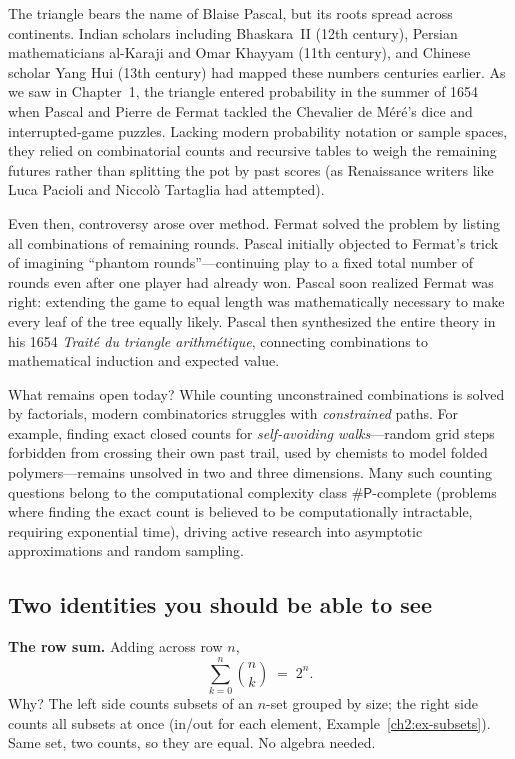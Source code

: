 \begin{historybox}
The triangle bears the name of Blaise Pascal, but its roots spread across continents.
Indian scholars including Bhaskara~II (12th century), Persian mathematicians al-Karaji
and Omar Khayyam (11th century), and Chinese scholar Yang Hui (13th century) had mapped
these numbers centuries earlier. As we saw in Chapter~1, the triangle entered probability
in the summer of 1654 when Pascal and Pierre de Fermat tackled the Chevalier de M\'er\'e's
dice and interrupted-game puzzles. Lacking modern probability notation or sample spaces,
they relied on combinatorial counts and recursive tables to weigh the remaining futures
rather than splitting the pot by past scores (as Renaissance writers like Luca Pacioli and
Niccol\`o Tartaglia had attempted).

Even then, controversy arose over method. Fermat solved the problem by listing all
combinations of remaining rounds. Pascal initially objected to Fermat's trick of
imagining ``phantom rounds''---continuing play to a fixed total number of rounds even
after one player had already won. Pascal soon realized Fermat was right: extending the game
to equal length was mathematically necessary to make every leaf of the tree equally likely.
Pascal then synthesized the entire theory in his 1654 \emph{Trait\'e du triangle
arithm\'etique}, connecting combinations to mathematical induction and expected value.

What remains open today? While counting unconstrained combinations is solved by
factorials, modern combinatorics struggles with \emph{constrained} paths. For example,
finding exact closed counts for \emph{self-avoiding walks}---random grid steps forbidden
from crossing their own past trail, used by chemists to model folded polymers---remains
unsolved in two and three dimensions. Many such counting questions belong to the
computational complexity class $\#\mathsf{P}$-complete (problems where finding the exact
count is believed to be computationally intractable, requiring exponential time), driving
active research into asymptotic approximations and random sampling.
\end{historybox}

\subsection{Two identities you should be able to see}

\textbf{The row sum.} Adding across row $n$,
\[
  \sum_{k=0}^{n} \binom{n}{k} \;=\; 2^n.
\]
Why? The left side counts subsets of an $n$-set grouped by size; the right side counts all
subsets at once (in/out for each element, Example~\ref{ch2:ex-subsets}). Same set, two
counts, so they are equal. No algebra needed.

